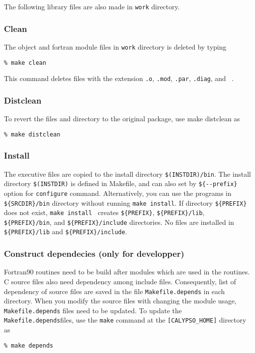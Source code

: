 %
The following library files are also made in {\tt work} directory.
%
%

\subsubsection{Clean}
The object and fortran module files in {\tt work} directory is deleted by typing
\begin{verbatim}
% make clean
\end{verbatim}
This command deletes files with the extension {\tt .o}, {\tt .mod}, {\tt .par}, {\tt .diag}, and {\tt ~}.

\subsubsection{Distclean}
To revert the files and directory to the original package, use make distclean as
\begin{verbatim}
% make distclean
\end{verbatim}

\subsubsection{Install}
 The executive files are copied to the install directory \verb|$(INSTDIR)/bin|. The install directory \verb|$(INSTDIR)| is defined in Makefile, and can also set by  \verb|${--prefix}| option for \verb|configure| command. Alternatively, you can use the programs in \verb|${SRCDIR}/bin| directory without running \verb|make install|. If directory \verb|${PREFIX}| does not exist, \verb|make install | creates  \verb|${PREFIX}|,  \verb|${PREFIX}/lib|,  \verb|${PREFIX}/bin|, and  \verb|${PREFIX}/include| directories. No files are installed in \verb|${PREFIX}/lib| and \verb|${PREFIX}/include|.

\subsubsection{Construct dependecies (only for developper)}
Fortran90 routines need to be build after modules which are used in the routines. C source files also need dependency among include files. Consequently, list of dependency of source files are saved in the file \verb|Makefile.depends| in each directory. When you modify the source files with changing the module usage,  \verb|Makefile.depends| files need to be updated. To update the  \verb|Makefile.depends|files, use the  \verb|make| command at the \verb|[CALYPSO_HOME]| directory as \\
%
\begin{verbatim}
% make depends
\end{verbatim}

